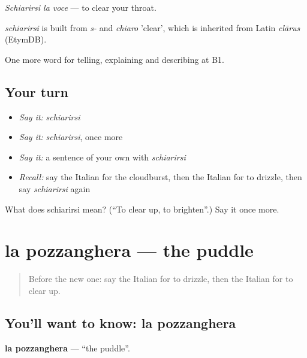 \emph{Schiarirsi la voce} — to clear your throat.

\begin{cousinweb}
\emph{schiarirsi} is built from \emph{s-} and \emph{chiaro} 'clear', which is inherited from Latin \emph{clārus} (EtymDB).
\end{cousinweb}

\begin{grammarlens}[title={What you've built}]
One more word for telling, explaining and describing at B1.
\end{grammarlens}

\subsection*{Your turn}
\begin{itemize}
\raggedright
  \item \emph{Say it:} \emph{schiarirsi}
  \item \emph{Say it:} \emph{schiarirsi}, once more
  \item \emph{Say it:} a sentence of your own with \emph{schiarirsi}
  \item \emph{Recall:} say the Italian for the cloudburst, then the Italian for to drizzle, then say \emph{schiarirsi} again
\end{itemize}

\begin{tcolorbox}[breakable,colback=teal!4,colframe=teal!35!black,title={Before you move on}]
What does schiarirsi mean? (\textquotedblleft{}To clear up, to brighten\textquotedblright{}.) Say it once more.
\end{tcolorbox}
\section[la pozzanghera]{la pozzanghera — the puddle}

\label{lesson:IT-C470-pozzanghera}



\begin{quote}
Before the new one: say the Italian for to drizzle, then the Italian for to clear up.
\end{quote}

\subsection*{You'll want to know: la pozzanghera}
\textbf{la pozzanghera} — \textquotedblleft{}the puddle\textquotedblright{}.

